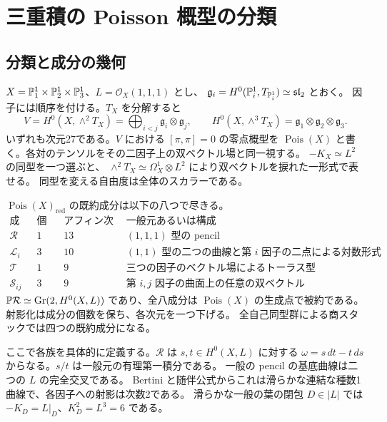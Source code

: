 \section{三重積の Poisson 概型の分類}\label{cube:sec:classification}
\subsection{分類と成分の幾何}
$X=\mathbb P^1_1\times\mathbb P^1_2\times\mathbb P^1_3$、$L=\mathcal O_X(1,1,1)$ とし、
$\mathfrak g_i=H^0(\mathbb P^1_i,T_{\mathbb P^1_i})\simeq\mathfrak{sl}_2$ とおく。
因子には順序を付ける。$T_X$ を分解すると
\[
 V=H^0(X,\wedge^2T_X)=\bigoplus_{i<j}\mathfrak g_i\otimes\mathfrak g_j,\qquad
 H^0(X,\wedge^3T_X)=\mathfrak g_1\otimes\mathfrak g_2\otimes\mathfrak g_3.
\]
いずれも次元27である。$V$ における $[\pi,\pi]=0$ の零点概型を
$\operatorname{Pois}(X)$ と書く。各対のテンソルをその二因子上の双ベクトル場と同一視する。
$-K_X\simeq L^2$ の同型を一つ選ぶと、
$\wedge^2 T_X\simeq\Omega_X^1\otimes L^2$ により双ベクトルを捩れた一形式で表せる。
同型を変える自由度は全体のスカラーである。

\begin{theorem}\label{cube:th:classification}
$\operatorname{Pois}(X)_{\mathrm{red}}$ の既約成分は以下の八つで尽きる。
\[
\begin{array}{c|c|c|l}
\text{成分}&\text{個数}&\text{アフィン次元}&\text{一般元あるいは構成}\\ \hline
\mathcal R&1&13& (1,1,1)\text{ 型の pencil}\\
\mathcal L_i&3&10& (1,1)\text{ 型の二つの曲線と第 }i\text{ 因子の二点による対数形式}\\
\mathcal T&1&9& \text{三つの因子のベクトル場によるトーラス型}\\
\mathcal S_{ij}&3&9& \text{第 }i,j\text{ 因子の曲面上の任意の双ベクトル}
\end{array}
\]
$\mathbb P\mathcal R\simeq\operatorname{Gr}(2,H^0(X,L))$ であり、全八成分は $\operatorname{Pois}(X)$ の生成点で被約である。
射影化は成分の個数を保ち、各次元を一つ下げる。
全自己同型群による商スタックでは四つの既約成分になる。
\end{theorem}

ここで各族を具体的に定義する。$\mathcal R$ は $s,t\in H^0(X,L)$ に対する
$\omega=s\,dt-t\,ds$ からなる。$s/t$ は一般元の有理第一積分である。
一般の pencil の基底曲線は二つの $L$ の完全交叉である。
Bertini と随伴公式からこれは滑らかな連結な種数1曲線で、各因子への射影は次数2である。
滑らかな一般の葉の閉包 $D\in |L|$ では $-K_D=L|_D$、$K_D^2=L^3=6$ である。

